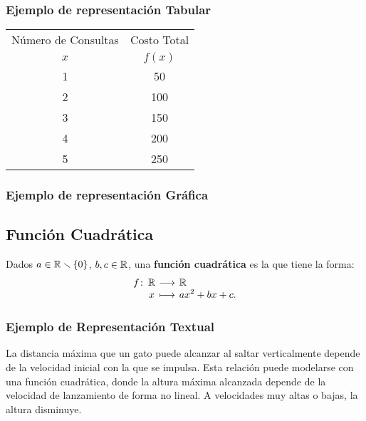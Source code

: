 \documentclass[a4,11pt]{aleph-notas}
\begin{document}
\subsubsection*{Ejemplo de representación Tabular}

\begin{center}\small
\begin{tabular}{@{}cc@{}}
\toprule
Número de Consultas & Costo Total \\
$x$ & $f(x)$\\
\midrule
1 & 50 \\
2 & 100 \\
3 & 150 \\
4 & 200 \\
5 & 250 \\
\bottomrule
\end{tabular}
\end{center} 

\subsubsection*{Ejemplo de representación Gráfica}
\begin{center}
\end{center}

\subsection*{Función Cuadrática}

\begin{defi}  
Dados $a \in \mathbb{R} \smallsetminus \{0\}$, $b,c\in\mathbb{R}$, una \textbf{función cuadrática} es la que tiene la forma:
\[
\funcion{f}{\R}{\R}{x}{ax^2 + bx + c.}
\]
\end{defi}

\subsubsection*{Ejemplo de Representación Textual}  
La distancia máxima que un gato puede alcanzar al saltar verticalmente depende de la velocidad inicial con la que se impulsa. Esta relación puede modelarse con una función cuadrática, donde la altura máxima alcanzada depende de la velocidad de lanzamiento de forma no lineal. A velocidades muy altas o bajas, la altura disminuye.
\end{document}
